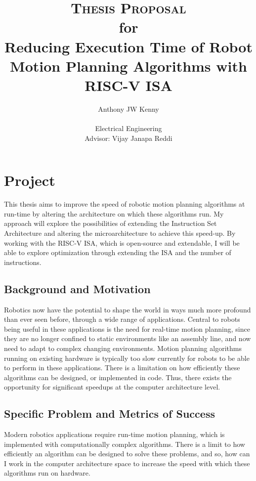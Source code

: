 \documentclass[11pt, oneside]{article}   	%
\title{\textsc{Thesis Proposal} \\ 
	\small{for} \\ 
	\Large{Reducing Execution Time of Robot Motion Planning Algorithms with RISC-V ISA}}
\author{Anthony JW Kenny \\ \\
        Electrical Engineering \\
        Advisor: Vijay Janapa Reddi}
\begin{document}
\maketitle



\section{Project}
This thesis aims to improve the speed of robotic motion planning algorithms at run-time by altering the architecture on which these algorithms run. My approach will explore the possibilities of extending the Instruction Set Architecture and altering the microarchitecture to achieve this speed-up. By working with the RISC-V ISA, which is open-source and extendable, I will be able to explore optimization through extending the ISA and the number of instructions.

\subsection{Background and Motivation}
Robotics now have the potential to shape the world in ways much more profound than ever seen before, through a wide range of applications. Central to robots being useful in these applications is the need for real-time motion planning, since they are no longer confined to static environments like an assembly line, and now need to adapt to complex changing environments. Motion planning algorithms running on existing hardware is typically too slow currently for robots to be able to perform in these applications. There is a limitation on how efficiently these algorithms can be designed, or implemented in code. Thus, there exists the opportunity for significant speedups at the computer architecture level. 

\subsection{Specific Problem and Metrics of Success}
Modern robotics applications require run-time motion planning, which is implemented with computationally complex algorithms. There is a limit to how efficiently an algorithm can be designed to solve these problems, and so, how can I work in the computer architecture space to increase the speed with which these algorithms run on hardware.
\end{document}
